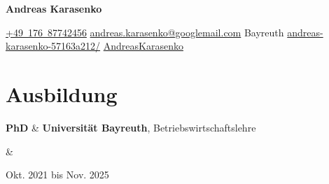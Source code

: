 \documentclass[10pt, a4paper]{article}
\newenvironment{header}{
        \setlength{\topsep}{0pt}\par\kern\topsep\centering\color{primaryColor}\linespread{1.5}
    }{
        \par\kern\topsep
    } %
\let\hrefWithoutArrow\href
\renewcommand{\href}[2]{\hrefWithoutArrow{#1}{\mbox{\ifthenelse{\equal{#2}{}}{ }{#2 }\raisebox{.15ex}{\footnotesize \faExternalLink*}}}}
\let\originalTabularx\tabularx
\let\originalEndTabularx\endtabularx
\renewenvironment{tabularx}{\bgroup\centering\originalTabularx}{\originalEndTabularx\par\egroup}
\begin{document}
    \begin{header}
        \fontsize{30 pt}{30 pt}
        \textbf{Andreas Karasenko}

        \vspace{0.3 cm}

        \normalsize
        \mbox{\hrefWithoutArrow{tel:+4917687742456}{{\footnotesize\faPhone*}\hspace*{0.13cm}+49 176 87742456}}
        \hspace*{0.5 cm}
        \mbox{\hrefWithoutArrow{mailto:andreas.karasenko@googlemail.com}{{\small\faEnvelope[regular]}\hspace*{0.13cm}andreas.karasenko@googlemail.com}}
        \hspace*{0.5 cm}
        \mbox{{\small\faMapMarker*}\hspace*{0.13cm}Bayreuth}
        \hspace*{0.5 cm}
        \mbox{\hrefWithoutArrow{https://linkedin.com/in/andreas-karasenko-57163a212/}{{\small\faLinkedinIn}\hspace*{0.13cm}andreas-karasenko-57163a212/}}
        \hspace*{0.5 cm}
        \mbox{\hrefWithoutArrow{https://github.com/AndreasKarasenko}{{\small\faGithub}\hspace*{0.13cm}AndreasKarasenko}}
        \hspace*{0.5 cm}
    \end{header}

    \vspace{0.3 cm}


    \section{Ausbildung}

        \begin{tabularx}{
            \textwidth-0.4 cm-0.13cm
        }{
            L{0.85cm}
            K{0.2 cm}
            R{4.1 cm}
        }
            \textbf{PhD}
            &
            \textbf{Universität Bayreuth}, Betriebswirtschaftslehre

            \vspace{0.10 cm}

            &
            

            Okt. 2021 bis Nov. 2025
        \end{tabularx}
\end{document}
